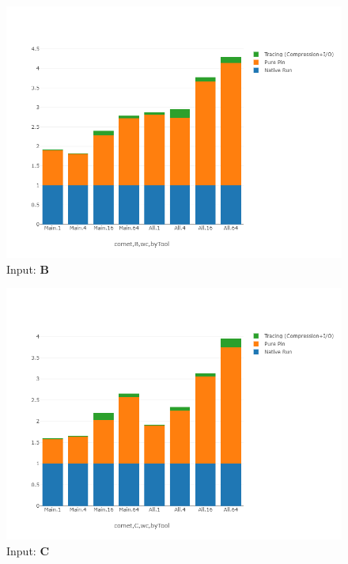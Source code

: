 




















\begin{figure}[!t]
\centering
\includegraphics[width=6in]{figs.comet/comet_chartDet_B_wc_byTool_p3_5.png}
\caption{ Input: \textbf{B}
}
\label{comet_chartDet_B_wc_byTool_p3_5}
\end{figure}


\begin{figure}[!t]
\centering
\includegraphics[width=6in]{figs.comet/comet_chartDet_C_wc_byTool_p3_5.png}
\caption{ Input: \textbf{C}
}
\label{comet_chartDet_C_wc_byTool_p3_5}
\end{figure}





